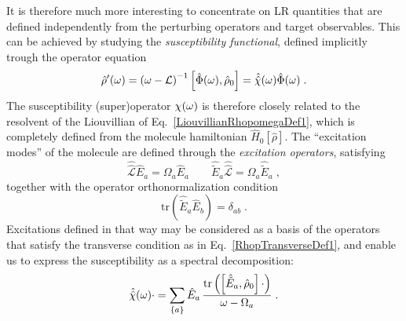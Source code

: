 \documentclass[reprint,aps,prb]{revtex4-1}
\newcommand{\be}{\begin{equation}}
\newcommand{\ee}{\end{equation}}
\newcommand{\qq}{\qquad}
\newcommand{\lb}{\label}
\newcommand{\op}[1]{\hat {#1}}
\newcommand{\sop}[1]{\op{\op {#1}}}
\newcommand{\commutator}[2]{\left[ {#1} , {#2} \right]}
\newcommand{\trace}[1]{\mathrm{tr}\left(#1\right)}
\newcommand{\dmnot}{\op{\rho}_0}
\newcommand{\dm}{\op{\rho}}
\newcommand{\hnot}{\op{H}_0}
\newcommand{\Liouv}{\sop{\mathcal L}}
\begin{document}
It is therefore much more interesting to concentrate on LR quantities that are defined independently from the perturbing operators and target observables.
This can be achieved by studying the 
\emph{susceptibility functional}, defined implicitly trough the operator equation  
\be\lb{SusceptibilityDef1}
\dm'(\omega) = \left(\omega -\mathcal L \right)^{-1} \commutator{\op \Phi(\omega)}{\dmnot} = \sop{{\cal \chi}}(\omega) \op\Phi(\omega) \;. 
\ee
The susceptibility (super)operator $\cal \chi(\omega)$ is therefore closely related to the resolvent of the Liouvillian of Eq.~\eqref{LiouvillianRhopomegaDef1}, which is completely defined 
from the molecule hamiltonian $\hnot[\dm]$.
The ``excitation modes''  of the molecule are defined through the \emph{excitation operators}, satisfying
\be\lb{ExcitationOperatorsDef1}
\Liouv \op E_a = \Omega_a \op E_a \qq \op{\tilde E}_a \Liouv = \Omega_a \op{\tilde E}_a \;,
\ee
together with the operator orthonormalization condition %
\be\lb{orthoExcitatioOpDef1}
\trace{\op{\tilde E}_a\op E_b} = \delta_{ab} \;.
\ee
Excitations defined in that way may be considered as a basis of the operators that satisfy the transverse condition as in  
Eq.~\eqref{RhopTransverseDef1}, and enable us to express the susceptibility as a spectral decomposition:
\be\lb{RhopExcitationDef1}
\sop{{\cal \chi}}(\omega) \cdot   = \sum_{\{a\}} \op E_{a} \,
\frac{\trace{\commutator{\op{\tilde E}_a}{\dmnot}\cdot}}{\omega-\Omega_a} \;.
\ee 
\end{document}
